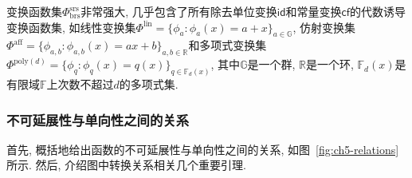 \begin{note}
变换函数集$\Phi_\text{brs}^\text{srs}$非常强大, 几乎包含了所有除去单位变换$\mathsf{id}$和常量变换$\mathsf{cf}$的代数诱导变换函数集, 如线性变换集$\Phi^\text{lin} = \{\phi_a : \phi_a(x) = a + x\}_{a \in \mathbb{G}}$, 仿射变换集$\Phi^\text{aff} = \{\phi_{a,b} : \phi_{a,b}(x) = ax + b\}_{a,b \in \mathbb{R}}$和多项式变换集$\Phi^{\text{poly}(d)} = \{\phi_q : \phi_q(x) = q(x)\}_{q \in \mathbb{F}_d(x)}$, 其中$\mathbb{G}$是一个群, $\mathbb{R}$是一个环, $\mathbb{F}_d(x)$是有限域$\mathbb{F}$上次数不超过$d$的多项式集. 
\end{note}

\subsubsection{不可延展性与单向性之间的关系}
首先, 概括地给出函数的不可延展性与单向性之间的关系, 如图~\ref{fig:ch5-relations}所示. 然后, 介绍图中转换关系相关几个重要引理.
